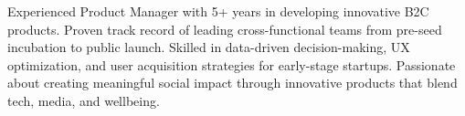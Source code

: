 


Experienced Product Manager with 5+ years
in developing innovative B2C products.
Proven track record of leading cross-functional teams
from pre-seed incubation to public launch.
Skilled in data-driven decision-making, UX optimization, and user acquisition strategies for early-stage startups.
Passionate about
creating meaningful social impact through innovative products that blend
tech,
media, and wellbeing.


%

